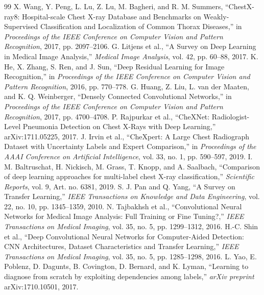 \documentclass[12pt, oneside]{book}
\begin{document}
\renewcommand{\bibname}{References}
\begin{thebibliography}{99}
X. Wang, Y. Peng, L. Lu, Z. Lu, M. Bagheri, and R. M. Summers, ``ChestX-ray8: Hospital-scale Chest X-ray Database and Benchmarks on Weakly-Supervised Classification and Localization of Common Thorax Diseases,'' in \textit{Proceedings of the IEEE Conference on Computer Vision and Pattern Recognition}, 2017, pp. 2097--2106.
G. Litjens et al., ``A Survey on Deep Learning in Medical Image Analysis,'' \textit{Medical Image Analysis}, vol. 42, pp. 60--88, 2017.
K. He, X. Zhang, S. Ren, and J. Sun, ``Deep Residual Learning for Image Recognition,'' in \textit{Proceedings of the IEEE Conference on Computer Vision and Pattern Recognition}, 2016, pp. 770--778.
G. Huang, Z. Liu, L. van der Maaten, and K. Q. Weinberger, ``Densely Connected Convolutional Networks,'' in \textit{Proceedings of the IEEE Conference on Computer Vision and Pattern Recognition}, 2017, pp. 4700--4708.
P. Rajpurkar et al., ``CheXNet: Radiologist-Level Pneumonia Detection on Chest X-Rays with Deep Learning,'' arXiv:1711.05225, 2017.
J. Irvin et al., ``CheXpert: A Large Chest Radiograph Dataset with Uncertainty Labels and Expert Comparison,'' in \textit{Proceedings of the AAAI Conference on Artificial Intelligence}, vol. 33, no. 1, pp. 590--597, 2019.
I. M. Baltruschat, H. Nickisch, M. Grass, T. Knopp, and A. Saalbach, ``Comparison of deep learning approaches for multi-label chest X-ray classification,'' \textit{Scientific Reports}, vol. 9, Art. no. 6381, 2019.
S. J. Pan and Q. Yang, ``A Survey on Transfer Learning,'' \textit{IEEE Transactions on Knowledge and Data Engineering}, vol. 22, no. 10, pp. 1345--1359, 2010.
N. Tajbakhsh et al., ``Convolutional Neural Networks for Medical Image Analysis: Full Training or Fine Tuning?,'' \textit{IEEE Transactions on Medical Imaging}, vol. 35, no. 5, pp. 1299--1312, 2016.
H.-C. Shin et al., ``Deep Convolutional Neural Networks for Computer-Aided Detection: CNN Architectures, Dataset Characteristics and Transfer Learning,'' \textit{IEEE Transactions on Medical Imaging}, vol. 35, no. 5, pp. 1285--1298, 2016.
L. Yao, E. Poblenz, D. Dagunts, B. Covington, D. Bernard, and K. Lyman, ``Learning to diagnose from scratch by exploiting dependencies among labels,'' \textit{arXiv preprint} arXiv:1710.10501, 2017.

\end{thebibliography}
\end{document}

